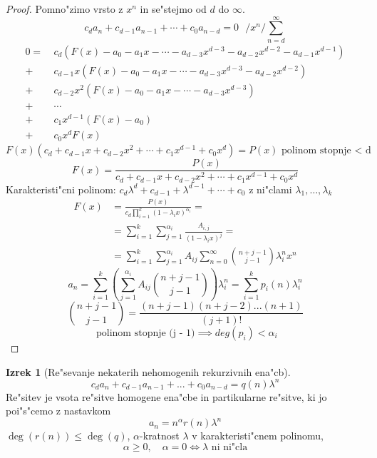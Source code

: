 \documentclass[a4paper,12pt]{article}
\theoremstyle{definition}
\newtheorem{theorem}[counter]{Izrek}
\theoremstyle{remark}
\begin{document}
\begin{proof}
	Pomno"zimo vrsto z $x^n$ in se"stejmo od $d$ do $\infty$.
    \[c_d a_n + c_{d - 1} a_{n - 1} + \cdots + c_0 a_{n - d} = 0 \ \ \ / x^n / \sum_{n = d}^{\infty}\]
    \begin{align*}
        0 = \ & c_d(F(x) - a_0 - a_1x - \cdots - a_{d - 3}x^{d - 3} - a_{d - 2}x^{d - 2} - a_{d - 1}x^{d - 1})\\
        +\ & c_{d - 1} x (F(x) - a_0 - a_1x - \cdots - a_{d - 3}x^{d - 3} - a_{d - 2}x^{d - 2})\\
        +\ & c_{d - 2} x^2 (F(x) - a_0 - a_1x - \cdots - a_{d - 3}x^{d - 3})\\
        +\ & \cdots \\
        +\ & c_1 x^{d - 1} (F(x) - a_0) \\
        +\ & c_0 x^d F(x)
    \end{align*}
    \[F(x) (c_d + c_{d - 1} x + c_{d - 2} x^2 + \cdots + c_1 x^{d - 1} + c_0 x^d) = P(x) \text{ polinom stopnje < d}\]
    \[F(x) = \frac{P(x)}{c_d + c_{d - 1} x + c_{d - 2} x^2 + \cdots + c_1 x^{d - 1} + c_0 x^d}\]
    Karakteristi"cni polinom: $c_d \lambda^d + c_{d - 1} + \lambda^{d - 1} + \cdots + c_0$ z ni"clami $\lambda_1, \ldots, \lambda_k$
    \begin{align*}
        F(x) & = \frac{P(x)}{c_d \prod_{i = 1}^k (1 - \lambda_i x)^{\alpha_i}} = \\
        & = \sum_{i = 1}^k \sum_{j = 1}^{\alpha_i} \frac{A_{i, j}}{(1 - \lambda_i x)^j} = \\
        & = \sum_{i = 1}^k \sum_{j = 1}^{\alpha_i} A_{i j} \sum_{n = 0}^{\infty} \binom{n + j - 1}{j - 1} \lambda_i^n x^n
    \end{align*}
    \[a_n = \sum_{i = 1}^k (\sum_{j = 1}^{\alpha_i} A_{i j} \binom{n + j - 1}{j - 1})\lambda_i^n = \sum_{i = 1}^k p_i(n)\lambda_i^n\]
    \[\binom{n + j - 1}{j - 1} = \frac{(n + j - 1)(n + j - 2) ... (n + 1)}{(j + 1)!}\]
    \[\text{ polinom stopnje (j - 1)} \implies deg(p_i) < \alpha_i\]
\end{proof}

\begin{theorem}[Re"sevanje nekaterih nehomogenih rekurzivnih ena"cb]
    \[c_d a_n + c_{d - 1} a_{n - 1} + ... + c_0 a_{n - d} = q(n) \lambda^n\]
    Re"sitev je vsota re"sitve homogene ena"cbe in partikularne re"sitve, ki jo poi"s"cemo z nastavkom
    \[a_n = n^{\alpha} r(n) \lambda^n\]
    $\deg(r(n)) \leqslant \deg(q)$, $\alpha$-kratnost $\lambda$ v karakteristi"cnem polinomu,
    \[\alpha \geqslant 0, \quad \alpha = 0 \iff \lambda \text{ ni ni"cla}\]
\end{theorem}
\end{document}
